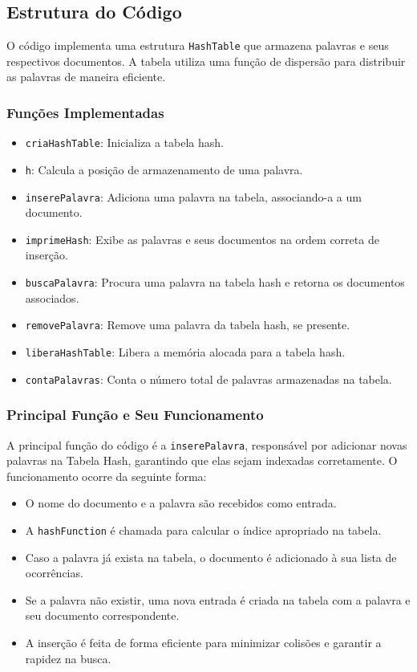 \documentclass[a4paper,12pt]{article}
\begin{document}
\subsection{Estrutura do C\'odigo}
O c\'odigo implementa uma estrutura \texttt{HashTable} que armazena palavras e seus respectivos documentos. A tabela utiliza uma fun\c{c}\~ao de dispers\~ao para distribuir as palavras de maneira eficiente.

\subsubsection{Fun\c{c}\~oes Implementadas}
\begin{itemize}
    \item \texttt{criaHashTable}: Inicializa a tabela hash.
    \item \texttt{h}: Calcula a posi\c{c}\~ao de armazenamento de uma palavra.
    \item \texttt{inserePalavra}: Adiciona uma palavra na tabela, associando-a a um documento.
    \item \texttt{imprimeHash}: Exibe as palavras e seus documentos na ordem correta de inser\c{c}\~ao.
    \item \texttt{buscaPalavra}: Procura uma palavra na tabela hash e retorna os documentos associados.
    \item \texttt{removePalavra}: Remove uma palavra da tabela hash, se presente.
    \item \texttt{liberaHashTable}: Libera a mem\'oria alocada para a tabela hash.
    \item \texttt{contaPalavras}: Conta o n\'umero total de palavras armazenadas na tabela.
\end{itemize}

\subsubsection{Principal Fun\c{c}\~ao e Seu Funcionamento}
A principal fun\c{c}\~ao do c\'odigo \'e a \texttt{inserePalavra}, respons\'avel por adicionar novas palavras na Tabela Hash, garantindo que elas sejam indexadas corretamente. O funcionamento ocorre da seguinte forma:

\begin{itemize}
    \item O nome do documento e a palavra s\~ao recebidos como entrada.
    \item A \texttt{hashFunction} \'e chamada para calcular o \'indice apropriado na tabela.
    \item Caso a palavra j\'a exista na tabela, o documento \'e adicionado \`a sua lista de ocorr\^encias.
    \item Se a palavra n\~ao existir, uma nova entrada \'e criada na tabela com a palavra e seu documento correspondente.
    \item A inser\c{c}\~ao \'e feita de forma eficiente para minimizar colis\~oes e garantir a rapidez na busca.
\end{itemize}
\end{document}
